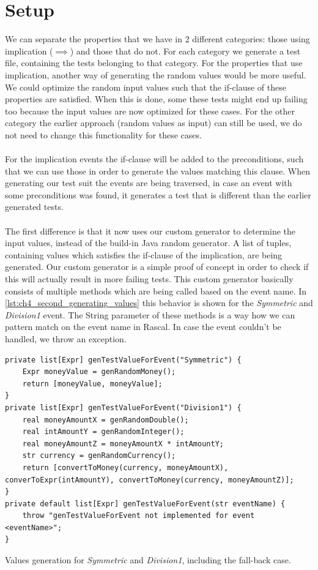 \section{Setup}
We can separate the properties that we have in 2 different categories: those using implication ($\implies$) and those that do not. For each category we generate a test file, containing the tests belonging to that category. For the properties that use implication, another way of generating the random values would be more useful. We could optimize the random input values such that the if-clause of these properties are satisfied. When this is done, some these tests might end up failing too because the input values are now optimized for these cases. For the other category the earlier approach (random values as input) can still be used, we do not need to change this functionality for these cases.\\
\\
For the implication events the if-clause will be added to the preconditions, such that we can use those in order to generate the values matching this clause. When generating our test suit the events are being traversed, in case an event with some preconditions was found, it generates a test that is different than the earlier generated tests.\\
\\
The first difference is that it now uses our custom generator to determine the input values, instead of the build-in Java random generator. A list of tuples, containing values which satisfies the if-clause of the implication, are being generated. Our custom generator is a simple proof of concept in order to check if this will actually result in more failing tests. This custom generator basically consists of multiple methods which are being called based on the event name. In \autoref{lst:ch4_second_generating_values} this behavior is shown for the \textit{Symmetric} and \textit{Division1} event. The String parameter of these methods is a way how we can pattern match on the event name in Rascal. In case the event couldn't be handled, we throw an exception.
\\
\begin{sourcecode}[h!]
\begin{lstlisting}[language=Rascal]
private list[Expr] genTestValueForEvent("Symmetric") {
    Expr moneyValue = genRandomMoney();
    return [moneyValue, moneyValue];
}
private list[Expr] genTestValueForEvent("Division1") {
    real moneyAmountX = genRandomDouble();
    real intAmountY = genRandomInteger();
    real moneyAmountZ = moneyAmountX * intAmountY;
    str currency = genRandomCurrency();
    return [convertToMoney(currency, moneyAmountX), converToExpr(intAmountY), convertToMoney(currency, moneyAmountZ)];
}
private default list[Expr] genTestValueForEvent(str eventName) {
    throw "genTestValueForEvent not implemented for event <eventName>";
}
\end{lstlisting}
\caption{Values generation for \textit{Symmetric} and \textit{Division1}, including the fall-back case.}
\label{lst:ch4_second_generating_values}
\end{sourcecode}
